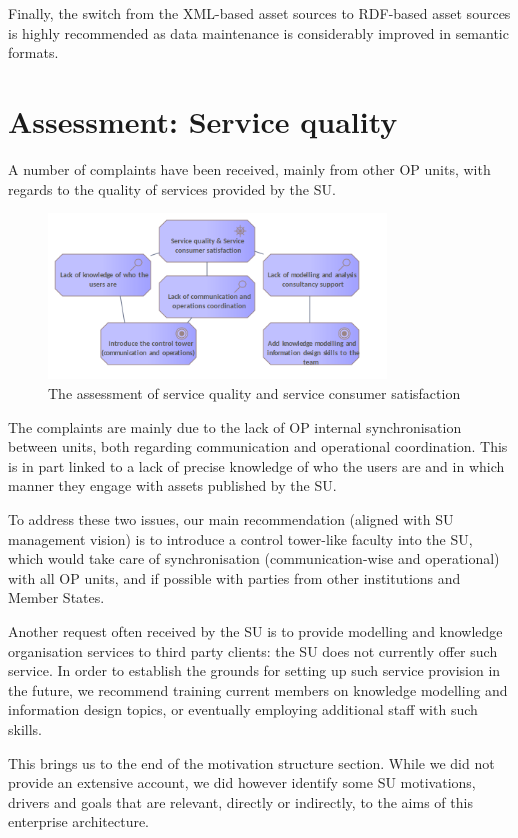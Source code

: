     Finally, the switch from the XML-based asset sources to RDF-based asset sources is highly recommended as data maintenance is considerably improved in semantic formats. 

	\section{Assessment: Service quality}

    A number of complaints have been received, mainly from other OP units, with regards to the quality of services provided by the SU. 

	\begin{figure}[h]
		\centering
		\includegraphics[width=0.8\textwidth]{images/motivation/Service quality.png}
		\caption{The assessment of service quality and service consumer satisfaction}
		\label{fig:service-quality}
	\end{figure}
	
	The complaints are mainly due to the lack of OP internal synchronisation between units, both regarding communication and operational coordination. This is in part linked to a lack of precise knowledge of who the users are and in which manner they engage with assets published by the SU. 
	
	
	To address these two issues, our main recommendation (aligned with SU management vision) is to introduce a control tower-like faculty into the SU, which would take care of synchronisation (communication-wise and operational) with all OP units, and if possible with parties from other institutions and Member States.
	
	Another request often received by the SU is to provide modelling and knowledge organisation services to third party clients: the SU does not currently offer such service. In order to establish the grounds for setting up such service provision in the future, we recommend training current members on knowledge modelling and information design topics, or eventually employing additional staff with such skills. 
	
	
	This brings us to the end of the motivation structure section. While we did not provide an extensive account, we did however identify some SU motivations, drivers and goals that are relevant, directly or indirectly, to the aims of this enterprise architecture.